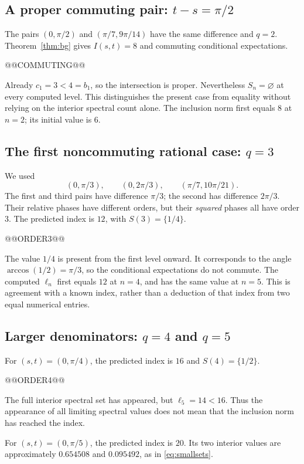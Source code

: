 \documentclass[11pt]{article}
\theoremstyle{definition}
\theoremstyle{remark}
\begin{document}
\subsection[A proper commuting pair]{A proper commuting pair: \(t-s=\pi/2\)}
The pairs \((0,\pi/2)\) and \((\pi/7,9\pi/14)\) have the same
difference and \(q=2\). Theorem~\ref{thm:bg} gives \(I(s,t)=8\)
and commuting conditional expectations.

@@COMMUTING@@

Already \(c_1=3<4=b_1\), so the intersection is proper.
Nevertheless \(S_n=\varnothing\) at every computed level.
This distinguishes the present case from equality without relying
on the interior spectral count alone. The inclusion norm first
equals \(8\) at \(n=2\); its initial value is \(6\).

\subsection[The first noncommuting rational case]{The first noncommuting rational case: \(q=3\)}
We used
\[
 (0,\pi/3),\qquad (0,2\pi/3),\qquad(\pi/7,10\pi/21).
\]
The first and third pairs have difference \(\pi/3\); the second
has difference \(2\pi/3\). Their relative phases have different orders,
but their \emph{squared} phases all have order \(3\).
The predicted index is \(12\), with \(S(3)=\{1/4\}\).

@@ORDER3@@

The value \(1/4\) is present from the first level onward. It corresponds
to the angle \(\arccos(1/2)=\pi/3\), so the conditional expectations
do not commute. The computed \(\ell_n\) first equals \(12\) at
\(n=4\), and has the same value at \(n=5\).
This is agreement with a known index, rather than a deduction of
that index from two equal numerical entries.

\subsection[Larger denominators]{Larger denominators: \(q=4\) and \(q=5\)}
For \((s,t)=(0,\pi/4)\), the predicted index is \(16\)
and \(S(4)=\{1/2\}\).

@@ORDER4@@

The full interior spectral set has appeared, but \(\ell_5=14<16\).
Thus the appearance of all limiting spectral values does not mean
that the inclusion norm has reached the index.

For \((s,t)=(0,\pi/5)\), the predicted index is \(20\).
Its two interior values are approximately \(0.654508\) and
\(0.095492\), as in \eqref{eq:smallsets}.
\end{document}
